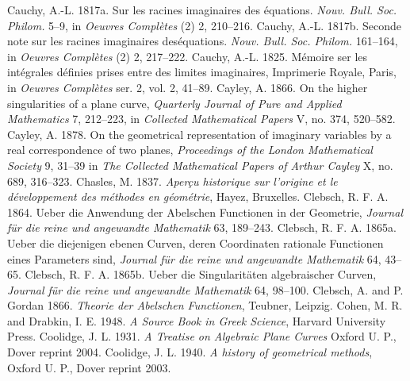 \newline\indent Cauchy, A.-L. 1817a. Sur les racines imaginaires des \'equations. \emph{Nouv. Bull. Soc. Philom.} 5--9, in  \emph{Oeuvres Compl\`etes} (2) 2, 210--216.
 \newline\indent Cauchy, A.-L. 1817b. Seconde note sur les racines imaginaires des\'equa\-tions. \emph{Nouv. Bull. Soc. Philom.} 161--164, in \emph{Oeuvres Compl\`etes} (2) 2, 217--222.
 \newline\indent  Cauchy, A.-L. 1825. M\'emoire ser les int\'egrales d\'efinies prises  entre des limites imaginaires, Imprimerie Royale, Paris, in \emph{Oeuvres Compl\`etes} ser. 2, vol. 2, 41--89. 
\newline\indent Cayley, A. 1866. On the higher singularities of a plane curve, \emph{Quarterly Journal of Pure and Applied Mathematics} 7, 212--223, in \emph{Collected Mathematical Papers} V, no. 374, 520--582.
\newline\indent   Cayley, A. 1878. On the geometrical representation of imaginary variables by a real correspondence of two planes, \emph{Proceedings of the  London Mathematical Society} 9, 31--39 in \emph{The Collected Mathematical Papers of Arthur Cayley} X, no. 689, 316--323.
\newline\indent Chasles, M. 1837.  \emph{Aper\c{c}u historique sur l'origine et le d\'eveloppement des m\'ethodes en g\'eom\'etrie}, Hayez, Bruxelles. 
\newline\indent Clebsch, R. F. A. 1864.  Ueber die Anwendung der Abelschen Functionen in der Geometrie, \emph{Journal f\"ur die reine und angewandte Mathematik}  63, 189--243.
\newline\indent Clebsch, R. F. A. 1865a. Ueber die diejenigen ebenen Curven, deren Coordinaten rationale Functionen eines Parameters sind, \emph{Journal f\"ur die reine und angewandte Mathematik} 64, 43--65.
\newline\indent Clebsch, R. F. A. 1865b. Ueber die Singularit\"aten algebraischer Curven, \emph{Journal f\"ur die reine und angewandte Mathematik} 64, 98--100.
\newline\indent Clebsch, A. and P. Gordan 1866. \emph{Theorie der Abelschen Functionen}, Teubner, Leipzig.
\newline\indent Cohen, M. R. and Drabkin, I. E. 1948. \emph{A Source Book in Greek Science}, Harvard University Press.
\newline\indent Coolidge, J. L.  1931. \emph{A Treatise on Algebraic Plane Curves} Oxford U. P., Dover reprint 2004.
\newline\indent Coolidge, J. L.  1940.  \emph{A history of geometrical methods}, Oxford U. P., Dover reprint 2003.
